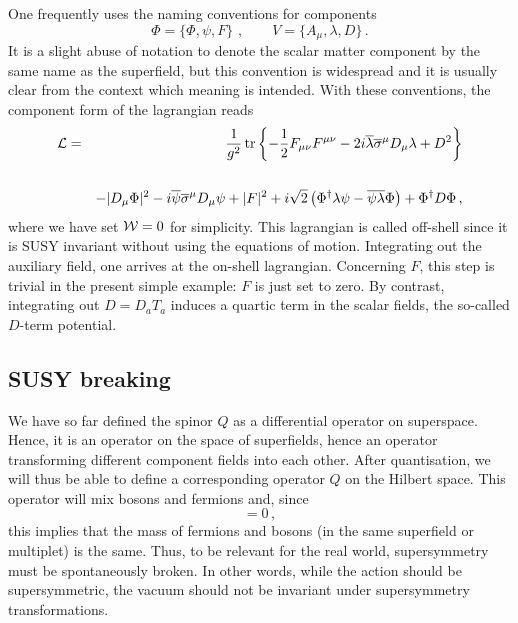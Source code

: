 \documentclass[12pt]{article}
\newcommand{\be}{\begin{equation}}
\newcommand{\ee}{\end{equation}}
\newcommand{\bea}{\begin{eqnarray}}
\newcommand{\eea}{\end{eqnarray}}
\newcommand{\ol}{\overline}
\numberwithin{equation}{section}
\begin{document}
One frequently uses the naming conventions for components
\be
\Phi=\{\Phi,\psi,F\}\,\,,\qquad V=\{A_\mu,\lambda,D\}\,.
\ee
It is a slight abuse of notation to denote the scalar matter component by the same name as the superfield, but this convention is widespread and it is usually clear from the context which meaning is intended. With these conventions, the component form of the lagrangian reads
\bea
{\cal L}&=&\frac{1}{g^2}\,\mbox{tr}\left\{ -\frac{1}{2}F_{\mu\nu}F^{\mu\nu} -2i\ol{\lambda}\ol{\sigma}^\mu D_\mu\lambda+D^2 \right\}
\\
\nonumber
\\
&&-|D_\mu\Phi|^2-i\ol{\psi}\ol{\sigma}^\mu D_\mu\psi+|F|^2+i\sqrt{2}\left(
\Phi^\dagger\lambda\psi-\ol{\psi}\ol{\lambda}\Phi\right) + \Phi^\dagger D \Phi\,, \nonumber
\eea
where we have set ${\cal W}=0$ for simplicity.
This lagrangian is called off-shell since it is SUSY invariant without using the equations of motion. Integrating out the auxiliary field, one arrives at the on-shell lagrangian. Concerning $F$, this step is trivial in the present simple example: $F$ is just set to zero. By contrast, integrating out $D=D_a T_a$ induces a quartic term in the scalar fields, the so-called $D$-term potential.






\subsection{SUSY breaking}\label{susybr}
We have so far defined the spinor $Q$ as a differential operator on superspace. Hence, it is an operator on the space of superfields, hence an operator transforming different component fields into each other. After quantisation, we will thus be able to define a corresponding operator $Q$ on the Hilbert space. This operator will mix bosons and fermions and, since
\be
[Q_\alpha,P_\mu P^\mu]=0\,,
\ee
this implies that the mass of fermions and bosons (in the same superfield or multiplet) is the same. Thus, to be relevant for the real world, supersymmetry must be spontaneously broken. In other words, while the action should be supersymmetric, the vacuum should not be invariant under supersymmetry transformations.
\end{document}
